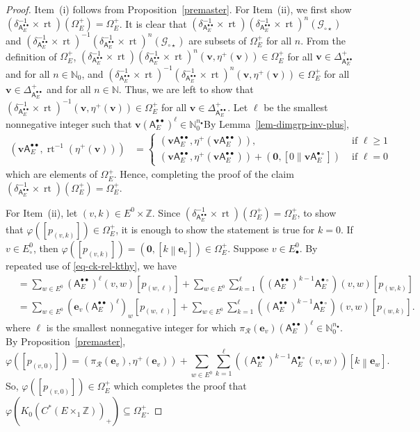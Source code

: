 \documentclass[12pt]{amsbook}%
\newcommand{\rt}{\operatorname{rt}}
\newcommand{\ee}{{\mathbf e}}
\renewcommand{\phi}{\varphi}
\theoremstyle{defin}
\theoremstyle{remark}
\numberwithin{equation}{chapter}
\numberwithin{theor}{section}
\newcommand{\NN}{\mathbb{N}}
\newcommand{\ZZ}{\mathbb{Z}}
\newcommand{\singgen}{\mathcal G_{\circ\star}}
\newcommand{\oXe}[2]{\left[#1\left\|{#2}\right.\right]}
\newcommand{\regX}{{\bullet}}
\newcommand{\singX}{{\circ}}
\newcommand{\vv}{\mathbf{v}}
\newcommand{\oo}{{\mathbf 0}}
\newcommand{\nor}{{n_\regX}}
\newcommand{\pK}[1]{\pi_{\mathcal R}(#1)}
\newcommand{\adjRR}{\mathsf{A}^{\bullet\bullet}}
\newcommand{\adjRS}{\mathsf{A}^{\bullet\circ}}
\newcommand{\nDT}{\Omega}
\begin{document}
\begin{proof}
Item~(i) follows from Proposition~\ref{premaster}.  For Item~(ii), we first show $(\delta_{\adjRR_E}^{-1} \times \rt)(\nDT_E^+) = \nDT_E^+$.  It is clear that $(\delta_{\adjRR_E}^{-1} \times \rt) (\delta_{\adjRR_E}^{-1}\times \rt)^n(\singgen)$ and $(\delta_{\adjRR_E}^{-1} \times \rt)^{-1} (\delta_{\adjRR_E}^{-1}\times \rt)^n(\singgen)$ are subsets of $\nDT_E^+$ for all $n$.   From the definition of $\nDT_E^+$, $(\delta_{\adjRR_E}^{-1} \times \rt) (\delta_{\adjRR_E}^{-1}\times \rt)^n(\vv, \eta^+(\vv)) \in \nDT_E^+$ for all $\vv \in \Delta_{\adjRR_E}^+$ and for all $n \in \NN_0$, and $(\delta_{\adjRR_E}^{-1} \times \rt)^{-1} (\delta_{\adjRR_E}^{-1}\times \rt)^n(\vv, \eta^+(\vv)) \in \nDT_E^+$ for all $\vv \in \Delta_{\adjRR_E}^+$ and for all $n \in \NN$.  Thus, we are left to show that $(\delta_{\adjRR_E}^{-1} \times \rt)^{-1}( \vv, \eta^+(\vv)) \in \nDT_E^+$ for all $\vv \in \Delta_{\adjRR_E}^+$.  Let $\ell$ be the smallest nonnegative integer such that $\vv (\adjRR_E)^\ell \in \NN_0^{\nor}$By Lemma~\ref{lem-dimgrp-inv-plus},
\begin{align*}
( \vv \adjRR_E, \rt^{-1} (\eta^+( \vv))) &= \begin{cases} ( \vv \adjRR_E, \eta^+( \vv \adjRR_E)) , &\text{ if } \ell \geq 1 \\  ( \vv \adjRR_E, \eta^+( \vv \adjRR_E)) + (\oo, \oXe{0}{\vv \adjRS_E}  )&\text{ if } \ell =0\end{cases}
\end{align*}
which are elements of $\nDT_E^+$.  Hence, completing the proof of the claim $(\delta_{\adjRR_E}^{-1} \times \rt)(\nDT_E^+) = \nDT_E^+$.

For Item~(ii), let $(v, k) \in E^0\times \ZZ$.  Since $(\delta_{\adjRR_E}^{-1} \times \rt)(\nDT_E^+) = \nDT_E^+$, to show that $\phi( [ p_{(v,k)} ] ) \in \nDT_E^+$, it is enough to show the statement is true for $k =0$.  If $v \in E^0_\singX$, then $\phi( [ p_{(v,k)} ] ) = (\oo, \oXe{k}{\ee_v})  \in \nDT_E^+$.  Suppose $v \in E_\regX^0$.  By repeated use of \eqref{eq-ck-rel-kthy}, we have 
\begin{align*}
[ p_{(v,0)}] &= \sum_{ w \in E^0} (\adjRR_E)^\ell( v, w) [ p_{(w, \ell)} ] + \sum_{w \in E^0} \sum_{ k = 1}^\ell ((\adjRR_E)^{k-1} \adjRS_E)(v,w) [ p_{(w,k)} ] \\
	&= \sum_{ w \in E^0} (\ee_v (\adjRR_E)^\ell)_w [ p_{(w, \ell)} ] + \sum_{w \in E^0} \sum_{ k = 1}^\ell ((\adjRR_E)^{k-1} \adjRS_E)(v,w) [ p_{(w,k)} ].
\end{align*}
where $\ell$ is the smallest nonnegative integer for which $\pK{\ee_v} (\adjRR_E)^\ell \in \NN_0^\nor$.  By Proposition~\ref{premaster}, 
$$
\phi( [ p_{(v,0)} ] ) = ( \pK{\ee_v }, \eta^+( \ee_v ) ) +  \sum_{w \in E^0} \sum_{ k = 1}^\ell ((\adjRR_E)^{k-1} \adjRS_E(v,w)) \oXe{k}{\ee_w}.
$$
So, $\phi( [ p_{(v,0)} ] )  \in \nDT_E^+$ which completes the proof that $\phi ( K_0( C^*(E \times_1\ZZ))_+) \subseteq \nDT_E^+$.


\end{proof}
\end{document}
